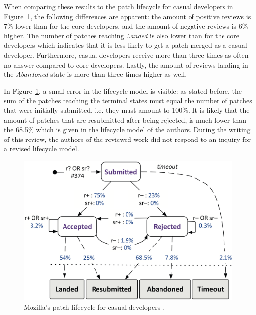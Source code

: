 \documentclass[conference]{IEEEtran}
\begin{document}
When comparing these results to the patch lifecycle for casual developers in Figure~\ref{fig:mozilla_casual_dev}, the following differences are apparent: the amount of positive reviews is 7\% lower than for the core developers, and the amount of negative reviews is 6\% higher. The number of patches reaching \textit{Landed} is also lower than for the core developers which indicates that it is less likely to get a patch merged as a casual developer. Furthermore, casual developers receive more than three times as often no answer compared to core developers. Lastly, the amount of reviews landing in the \textit{Abandoned} state is more than three times higher as well.

In Figure~\ref{fig:mozilla_casual_dev}, a small error in the lifecycle model is visible: as stated before, the sum of the patches reaching the terminal states must equal the number of patches that were initially submitted, i.e. they must amount to 100\%. It is likely that the amount of patches that are resubmitted after being rejected, is much lower than the 68.5\% which is given in the lifecycle model of the authors. During the writing of this review, the authors of the reviewed work did not respond to an inquiry for a revised lifecycle model.

\begin{figure}
    \centering
    \includegraphics[scale=0.23]{img/mozilla_casual_developers.png}
    \caption{Mozilla's patch lifecycle for casual developers \cite{baysal2015synthesizing}.}
    \label{fig:mozilla_casual_dev}
\end{figure}
\end{document}
